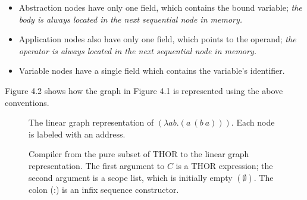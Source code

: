 \begin{itemize}
\item Abstraction nodes have only one field, which contains the bound variable; \emph{the body is always located in the next sequential node in memory.}
\item Application nodes also have only one field, which points to the operand; \emph{the operator is always located in the next sequential node in memory.}
\item Variable nodes have a single field which contains the variable's identifier.
\end{itemize}

Figure 4.2 shows how the graph in Figure 4.1 is represented using the above conventions.


\begin{figure}[htbp]
\centering

\caption[Linear graph representation]{The linear graph representation of \((\lambda ab.(a\ (b\ a)))\). Each node is labeled with an address.}
\end{figure}

\begin{figure}[htbp]
\centering
\setlength{\fboxsep}{8pt}
\caption[THOR to linear graph compiler]{Compiler from the pure \lambdacalculus{} subset of THOR to the linear graph representation. The first argument to \(C\) is a THOR expression; the second argument is a scope list, which is initially empty \((\emptyset)\). The colon (:) is an infix sequence constructor.}
\end{figure}

